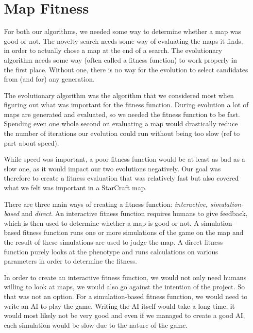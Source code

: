 \section{Map Fitness}
\label{methodology_mapfitness}

For both our algorithms, we needed some way to determine whether a map was good or not. The novelty search needs some way of evaluating the maps it finds, in order to actually chose a map at the end of a search. The evolutionary algorithm needs some way (often called a fitness function) to work properly in the first place. Without one, there is no way for the evolution to select candidates from (and for) any generation.

The evolutionary algorithm was the algorithm that we considered most when figuring out what was important for the fitness function. During evolution a lot of maps are generated and evaluated, so we needed the fitness function to be fast. Spending even one whole second on evaluating a map would drastically reduce the number of iterations our evolution could run without being too slow (ref to part about speed).

While speed was important, a poor fitness function would be at least as bad as a slow one, as it would impact our two evolutions negatively. Our goal was therefore to create a fitness evaluation that was relatively fast but also covered what we felt was important in a StarCraft map.

There are three main ways of creating a fitness function\cite{togelius2010multiobjective}: \textit{interactive, simulation-based} and \textit{direct}. An interactive fitness function requires humans to give feedback, which is then used to determine whether a map is good or not. A simulation-based fitness function runs one or more simulations of the game on the map and the result of these simulations are used to judge the map. A direct fitness function purely looks at the phenotype and runs calculations on various parameters in order to determine the fitness.

In order to create an interactive fitness function, we would not only need humans willing to look at maps, we would also go against the intention of the project. So that was not an option. For a simulation-based fitness function, we would need to write an AI to play the game. Writing the AI itself would take a long time, it would most likely not be very good and even if we managed to create a good AI, each simulation would be slow due to the nature of the game.

